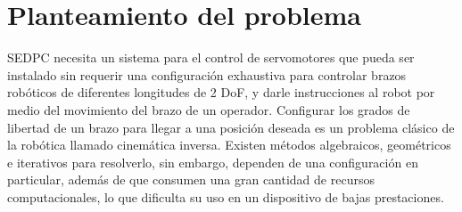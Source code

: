 \section{Planteamiento del problema}

SEDPC necesita un sistema para el control de servomotores que pueda ser instalado sin requerir una configuración exhaustiva para controlar brazos robóticos de diferentes longitudes de 2 DoF, y darle instrucciones al robot por medio del movimiento del brazo de un operador.
\newline\newline\newline
Configurar los grados de libertad de un brazo para llegar a una posición deseada es un problema clásico de la robótica llamado cinemática inversa. Existen métodos algebraicos, geométricos e iterativos para resolverlo, sin embargo, dependen de una configuración en particular, además de que consumen una gran cantidad de recursos computacionales, lo que dificulta su uso en un dispositivo de bajas prestaciones.